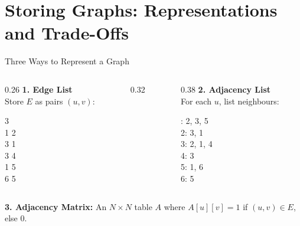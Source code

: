 \documentclass{beamer}
\begin{document}
\section{Storing Graphs: Representations and Trade-Offs}

\begin{frame}{Three Ways to Represent a Graph}
  \begin{columns}[c]
    \begin{column}{0.26\textwidth}
      \textbf{1. Edge List}\\
      Store $E$ as pairs $(u, v)$:\par\vspace{0.2em}
      {\scriptsize{} 3\\
        1 2\\
        3 1\\
        3 4\\
        1 5\\
        6 5\par}
    \end{column}
    \begin{column}{0.32\textwidth}
      \centering
    \end{column}
    \begin{column}{0.38\textwidth}
      \textbf{2. Adjacency List}\\
      For each $u$, list neighbours:\par\vspace{0.2em}
      {\scriptsize{}: 2, 3, 5\\
        2: 3, 1\\
        3: 2, 1, 4\\
        4: 3\\
        5: 1, 6\\
        6: 5\par}
    \end{column}
  \end{columns}
  \vspace{0.3em}
  \textbf{3. Adjacency Matrix:} An $N \times N$ table $A$ where $A[u][v] = 1$ if $(u,v) \in E$, else $0$.
\end{frame}
\end{document}
